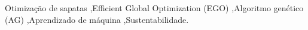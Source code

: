 \documentclass[preprint,11pt]{elsarticle}
\theoremstyle{plain}
\theoremstyle{definition}
\theoremstyle{remark}
\begin{document}
\begin{frontmatter}
\begin{abstract}
\end{abstract}

\begin{keyword}

Otimização de sapatas \sep Efficient Global Optimization (EGO) \sep Algoritmo genético (AG) \sep Aprendizado de máquina \sep Sustentabilidade.


\end{keyword}

\end{frontmatter}
\end{document}
